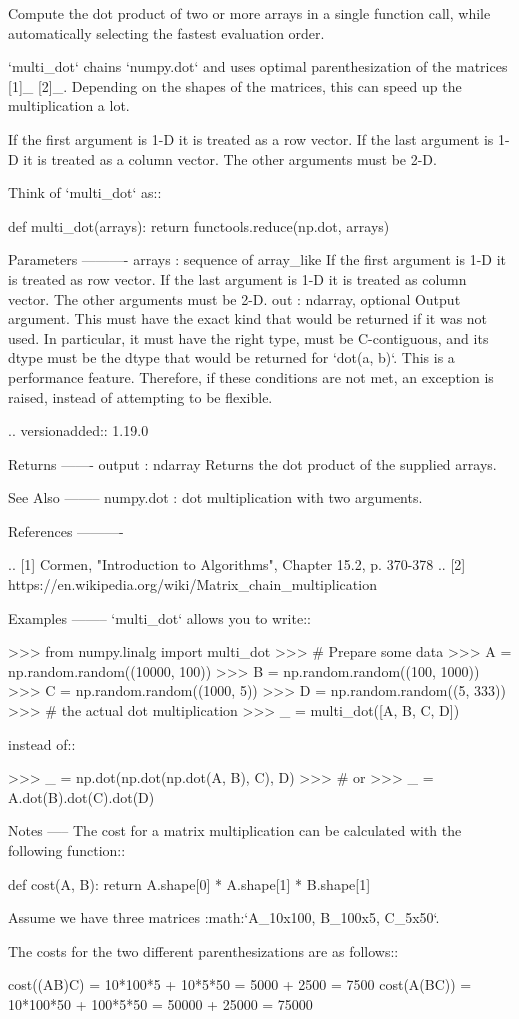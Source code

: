 \begin{DoxyVerb}Compute the dot product of two or more arrays in a single function call,
while automatically selecting the fastest evaluation order.

`multi_dot` chains `numpy.dot` and uses optimal parenthesization
of the matrices [1]_ [2]_. Depending on the shapes of the matrices,
this can speed up the multiplication a lot.

If the first argument is 1-D it is treated as a row vector.
If the last argument is 1-D it is treated as a column vector.
The other arguments must be 2-D.

Think of `multi_dot` as::

    def multi_dot(arrays): return functools.reduce(np.dot, arrays)


Parameters
----------
arrays : sequence of array_like
    If the first argument is 1-D it is treated as row vector.
    If the last argument is 1-D it is treated as column vector.
    The other arguments must be 2-D.
out : ndarray, optional
    Output argument. This must have the exact kind that would be returned
    if it was not used. In particular, it must have the right type, must be
    C-contiguous, and its dtype must be the dtype that would be returned
    for `dot(a, b)`. This is a performance feature. Therefore, if these
    conditions are not met, an exception is raised, instead of attempting
    to be flexible.

    .. versionadded:: 1.19.0

Returns
-------
output : ndarray
    Returns the dot product of the supplied arrays.

See Also
--------
numpy.dot : dot multiplication with two arguments.

References
----------

.. [1] Cormen, "Introduction to Algorithms", Chapter 15.2, p. 370-378
.. [2] https://en.wikipedia.org/wiki/Matrix_chain_multiplication

Examples
--------
`multi_dot` allows you to write::

>>> from numpy.linalg import multi_dot
>>> # Prepare some data
>>> A = np.random.random((10000, 100))
>>> B = np.random.random((100, 1000))
>>> C = np.random.random((1000, 5))
>>> D = np.random.random((5, 333))
>>> # the actual dot multiplication
>>> _ = multi_dot([A, B, C, D])

instead of::

>>> _ = np.dot(np.dot(np.dot(A, B), C), D)
>>> # or
>>> _ = A.dot(B).dot(C).dot(D)

Notes
-----
The cost for a matrix multiplication can be calculated with the
following function::

    def cost(A, B):
        return A.shape[0] * A.shape[1] * B.shape[1]

Assume we have three matrices
:math:`A_{10x100}, B_{100x5}, C_{5x50}`.

The costs for the two different parenthesizations are as follows::

    cost((AB)C) = 10*100*5 + 10*5*50   = 5000 + 2500   = 7500
    cost(A(BC)) = 10*100*50 + 100*5*50 = 50000 + 25000 = 75000\end{DoxyVerb}
